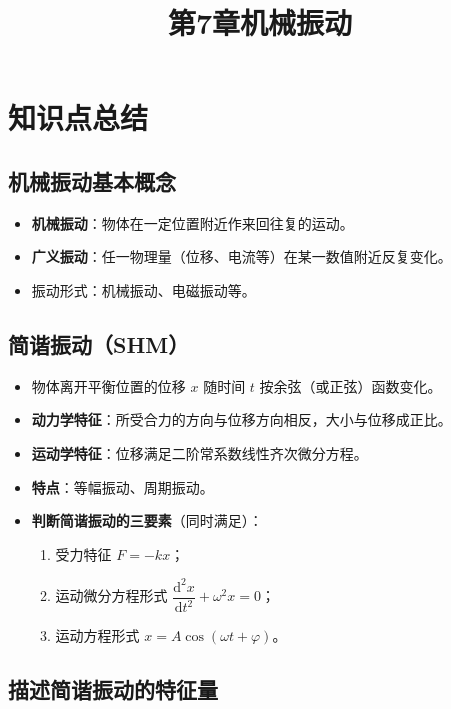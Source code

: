 \documentclass[12pt,a4paper]{ctexart}
\title{第7章\quad 机械振动}
\author{}
\date{}
\begin{document}
\maketitle

\section{知识点总结}

\subsection{机械振动基本概念}

\begin{itemize}
    \item \textbf{机械振动}：物体在一定位置附近作来回往复的运动。
    \item \textbf{广义振动}：任一物理量（位移、电流等）在某一数值附近反复变化。
    \item 振动形式：机械振动、电磁振动等。
\end{itemize}

\subsection{简谐振动（SHM）}

\begin{itemize}
    \item 物体离开平衡位置的位移 $x$ 随时间 $t$ 按余弦（或正弦）函数变化。
    \item \textbf{动力学特征}：所受合力的方向与位移方向相反，大小与位移成正比。
    \item \textbf{运动学特征}：位移满足二阶常系数线性齐次微分方程。
    \item \textbf{特点}：等幅振动、周期振动。
    \item \textbf{判断简谐振动的三要素}（同时满足）：
    \begin{enumerate}
        \item 受力特征 $F=-kx$；
        \item 运动微分方程形式 $\dfrac{\mathrm{d}^2x}{\mathrm{d}t^2}+\omega^2 x=0$；
        \item 运动方程形式 $x=A\cos(\omega t+\varphi)$。
    \end{enumerate}
\end{itemize}

\subsection{描述简谐振动的特征量}
\end{document}
